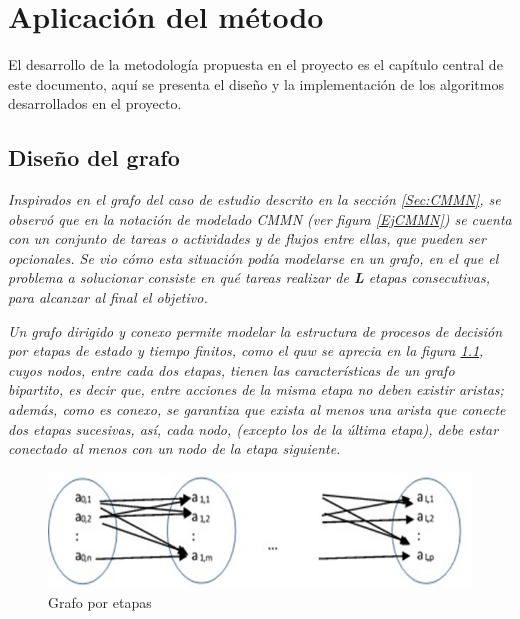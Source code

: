 \chapter{Aplicación del método}
\label{Metodo}
El desarrollo de la metodología propuesta en el proyecto es el capítulo central de este documento, aquí se presenta el diseño y la implementación de los algoritmos desarrollados en el proyecto.





\section{Diseño del grafo}

\textit{Inspirados en el grafo del caso de estudio descrito en la sección \ref{Sec:CMMN}, se observó que en la notación de modelado CMMN (ver figura \ref{EjCMMN}) se cuenta con un conjunto de tareas o actividades y de flujos entre ellas, que pueden ser opcionales. Se vio cómo esta situación podía modelarse en un grafo, en el que el problema a solucionar consiste en qué tareas realizar de \textbf{L} etapas consecutivas, para alcanzar al final el objetivo.}

\textit{Un grafo dirigido y conexo permite modelar la estructura de procesos de decisión por etapas de estado y tiempo finitos, como el quw se aprecia en la figura \ref{GrafoEtapas}, cuyos nodos, entre cada dos etapas, tienen las características de un grafo bipartito, es decir que, entre acciones de la misma etapa no deben existir aristas; además, como es conexo, se garantiza que exista al menos una arista que conecte dos etapas sucesivas, así, cada nodo, (excepto los de la última etapa), debe estar conectado al menos con un nodo de la etapa siguiente.}

\begin{figure}[H]
  \centering
    \includegraphics[scale=0.8]{GrafoEtapas.png}
  \caption{Grafo por etapas}
  \label{GrafoEtapas}
\end{figure}

